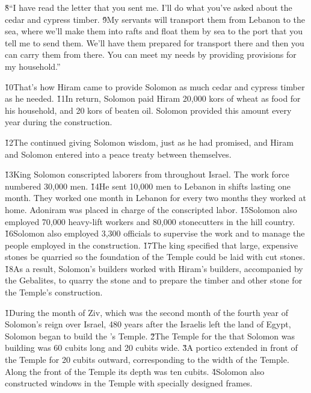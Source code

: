 \begin{poetry}
\poeml \v{8}``I have read the letter that you sent me. I'll do what you've asked about the cedar and cypress timber. \v{9}My servants will transport them from Lebanon to the sea, where we'll make them into rafts and float them by sea to the port that you tell me to send them. We'll have them prepared for transport there and then you can carry them from there. You can meet my needs by providing provisions for my household.''
\end{poetry}

\v{10}That's how Hiram came to provide Solomon as much cedar and cypress timber as he needed. \v{11}In return, Solomon paid Hiram 20,000 kors of wheat as food for his household, and 20 kors of beaten oil. Solomon provided this amount every year during the construction.

\v{12}The  continued giving Solomon wisdom, just as he had promised, and Hiram and Solomon entered into a peace treaty between themselves.

\v{13}King Solomon conscripted laborers from throughout Israel. The work force numbered 30,000 men. \v{14}He sent 10,000 men to Lebanon in shifts lasting one month. They worked one month in Lebanon for every two months they worked at home. Adoniram was placed in charge of the conscripted labor. \v{15}Solomon also employed 70,000 heavy-lift workers and 80,000 stonecutters in the hill country. \v{16}Solomon also employed 3,300 officials to supervise the work and to manage the people employed in the construction. \v{17}The king specified that large, expensive stones be quarried so the foundation of the Temple could be laid with cut stones. \v{18}As a result, Solomon's builders worked with Hiram's builders, accompanied by the Gebalites, to quarry the stone and to prepare the timber and other stone for the Temple's construction.

\v{1}During the month of Ziv, which was the second month of the fourth year of Solomon's reign over Israel, 480 years after the Israelis left the land of Egypt, Solomon began to build the 's Temple. \v{2}The Temple for the  that Solomon was building was 60 cubits long and 20 cubits wide. \v{3}A portico extended in front of the Temple for 20 cubits outward, corresponding to the width of the Temple. Along the front of the Temple its depth was ten cubits. \v{4}Solomon also constructed windows in the Temple with specially designed frames.

